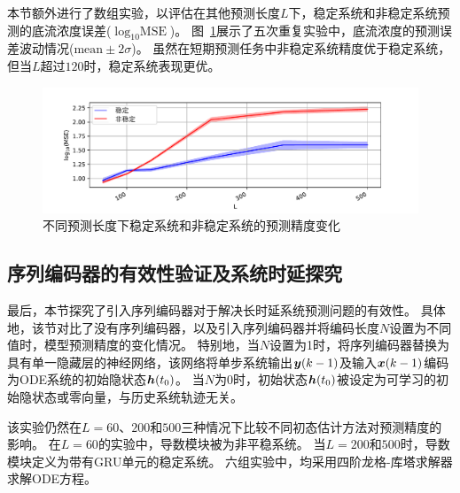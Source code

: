 本节额外进行了数组实验，以评估在其他预测长度$L$下，稳定系统和非稳定系统预测的底流浓度误差($\log_{10}{\text{MSE}}$)。
图~\ref{fig:length_cmp}展示了五次重复实验中，底流浓度的预测误差波动情况($\text{mean} \pm 2\sigma$)。
虽然在短期预测任务中非稳定系统精度优于稳定系统，但当$L$超过$120$时，稳定系统表现更优。
\begin{figure}[h]
    \centering
    \includegraphics[width=\linewidth,trim=50 0 50 10, clip]{figures/chapter3/length_cmp.pdf}
    \caption{
    不同预测长度下稳定系统和非稳定系统的预测精度变化
    }
    \label{fig:length_cmp}
\end{figure}




\subsection{序列编码器的有效性验证及系统时延探究}
\label{sec:3_enc_length}
最后，本节探究了引入序列编码器对于解决长时延系统预测问题的有效性。
具体地，该节对比了没有序列编码器，以及引入序列编码器并将编码长度$N$设置为不同值时，模型预测精度的变化情况。
特别地，当$N$设置为1时，将序列编码器替换为具有单一隐藏层的神经网络，该网络将单步系统输出$\boldsymbol y(k-1)$及输入$\boldsymbol x(k-1)$编码为ODE系统的初始隐状态$\boldsymbol h(t_0)$。
当$N$为0时，初始状态$\boldsymbol h(t_0)$被设定为可学习的初始隐状态\cite{Demeester2020SystemIW}或零向量，与历史系统轨迹无关。

该实验仍然在$L=60$、$200$和$500$三种情况下比较不同初态估计方法对预测精度的影响。
在$L=60$的实验中，导数模块被为非平稳系统。
当$L=200$和$500$时，导数模块定义为带有GRU单元的稳定系统。
六组实验中，均采用四阶龙格-库塔求解器求解ODE方程。



